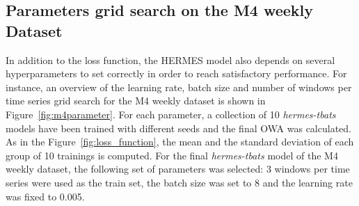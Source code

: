 \documentclass[10pt]{article} %
\begin{document}
\subsection{Parameters grid search on the M4 weekly Dataset}
\label{sec:m4gridsearch}

In addition to the loss function, the HERMES model also depends on several hyperparameters to set correctly in order to reach satisfactory performance. For instance, an overview of the learning rate, batch size and number of windows per time series grid search for the M4 weekly dataset is shown in Figure~\ref{fig:m4parameter}. For each parameter, a collection of 10 \textit{hermes-tbats} models have been trained with different seeds and the final OWA was calculated. As in the Figure~\ref{fig:loss_function}, the mean and the standard deviation of each group of 10 trainings is computed. For the final \textit{hermes-tbats} model of the M4 weekly dataset,  the following set of parameters was selected: 3 windows per time series were used as the train set, the batch size was set to 8 and the learning rate was fixed to 0.005.
\end{document}
